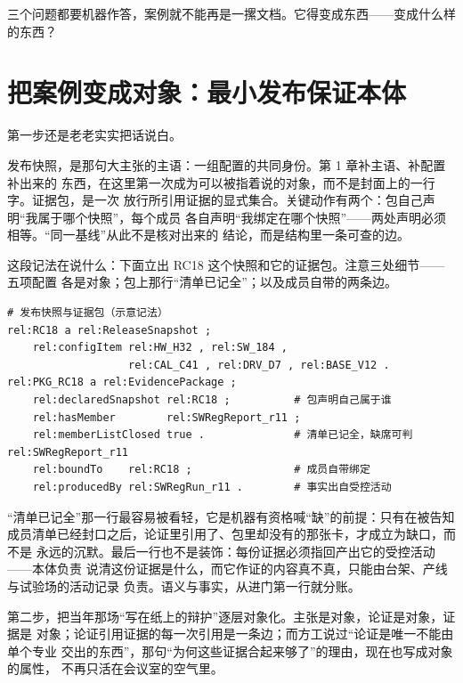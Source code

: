 三个问题都要机器作答，案例就不能再是一摞文档。它得变成东西——变成什么样的东西？

\section{把案例变成对象：最小发布保证本体}

第一步还是老老实实把话说白。

发布快照，是那句大主张的主语：一组配置的共同身份。第 1 章补主语、补配置补出来的
东西，在这里第一次成为可以被指着说的对象，而不是封面上的一行字。证据包，是一次
放行所引用证据的显式集合。关键动作有两个：包自己声明“我属于哪个快照”，每个成员
各自声明“我绑定在哪个快照”——两处声明必须相等。“同一基线”从此不是核对出来的
结论，而是结构里一条可查的边。

这段记法在说什么：下面立出 RC18 这个快照和它的证据包。注意三处细节——五项配置
各是对象；包上那行“清单已记全”；以及成员自带的两条边。

\nopagebreak[4]
\begin{codebox}
\begin{Verbatim}[fontsize=\small,breaklines=true,breakanywhere=true,breaksymbolleft={},breaksymbolright={}]
# 发布快照与证据包（示意记法）
rel:RC18 a rel:ReleaseSnapshot ;
    rel:configItem rel:HW_H32 , rel:SW_184 ,
                   rel:CAL_C41 , rel:DRV_D7 , rel:BASE_V12 .
rel:PKG_RC18 a rel:EvidencePackage ;
    rel:declaredSnapshot rel:RC18 ;          # 包声明自己属于谁
    rel:hasMember        rel:SWRegReport_r11 ;
    rel:memberListClosed true .              # 清单已记全，缺席可判
rel:SWRegReport_r11
    rel:boundTo    rel:RC18 ;                # 成员自带绑定
    rel:producedBy rel:SWRegRun_r11 .        # 事实出自受控活动
\end{Verbatim}
\end{codebox}

“清单已记全”那一行最容易被看轻，它是机器有资格喊“缺”的前提：只有在被告知
成员清单已经封口之后，论证里引用了、包里却没有的那张卡，才成立为缺口，而不是
永远的沉默。最后一行也不是装饰：每份证据必须指回产出它的受控活动——本体负责
说清这份证据是什么，而它作证的内容真不真，只能由台架、产线与试验场的活动记录
负责。语义与事实，从进门第一行就分账。

第二步，把当年那场“写在纸上的辩护”逐层对象化。主张是对象，论证是对象，证据是
对象；论证引用证据的每一次引用是一条边；而方工说过“论证是唯一不能由单个专业
交出的东西”，那句“为何这些证据合起来够了”的理由，现在也写成对象的属性，
不再只活在会议室的空气里。

